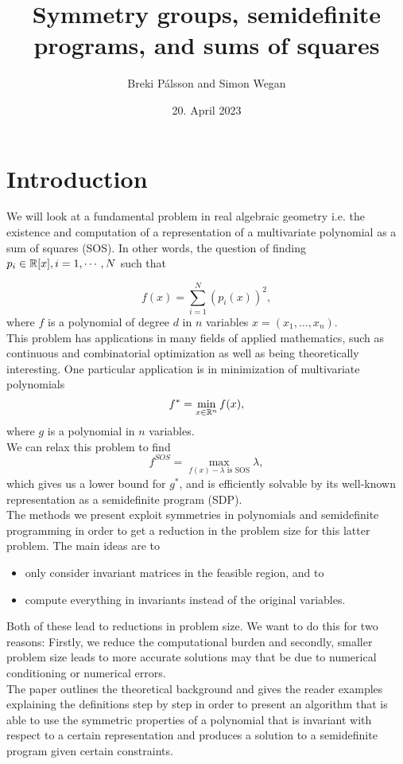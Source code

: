 \documentclass[]{article}
\begin{document}
\title{Symmetry groups, semidefinite programs, and sums of squares}
\author{Breki Pálsson and Simon Wegan}
\date{20. April 2023}

\maketitle

\section{Introduction}
We will look at a fundamental problem in real algebraic geometry i.e. the existence and computation of a
representation of a multivariate polynomial as a sum of squares (SOS). In other words, the
question of finding $p_i \in \mathbb R[x], i = 1, \cdots, N$ such that

\[
    f(x) = \sum_{i=1}^{N}(p_i(x))^2,
\]
where $f$ is a polynomial of degree $d$ in $n$ variables $x=(x_1,\ldots,x_n)$.\\
This problem has applications in many fields of applied mathematics, such as continuous and combinatorial optimization as well as being theoretically interesting. 
One particular application is in minimization of multivariate polynomials
\[
    f^\ast=\min_{x\in\mathbb R^n}f(x),
\]
where $g$ is a polynomial in $n$ variables.\\
We can relax this problem to find 
\[
    f^{SOS}=\max_{f(x)-\lambda \text{ is SOS}}\lambda,
\]
which gives us a lower bound for $g^\ast$, and is efficiently solvable by its well-known representation as a semidefinite program (SDP).\\

The methods we present exploit symmetries in polynomials and semidefinite programming in order to get a reduction in the problem size for this latter problem. 
The main ideas are to
\begin{itemize}
    \item only consider invariant matrices in the feasible region, and to
    \item compute everything in invariants instead of the original variables.
\end{itemize}
Both of these lead to reductions in problem size.
We want to do this for two reasons: Firstly, we reduce the computational burden and secondly, smaller problem size leads to more accurate solutions may that be due to numerical conditioning or numerical errors.\\

The paper outlines the theoretical background and gives the reader examples explaining the definitions step by step in order to present an algorithm that is able to use the 
symmetric properties of a polynomial that is invariant with respect to a certain representation and produces a solution to a semidefinite program given certain constraints.\\
\end{document}
